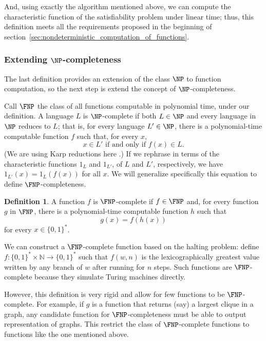 \documentclass[12pt]{article}
\theoremstyle{definition}
\newtheorem{definition}{Definition}
\begin{document}
And, using exactly the algorithm mentioned above,
we can compute the characteristic function of the satisfiability problem
under linear time;
thus, this definition meets all the requirements
proposed in the beginning of section~\ref{sec:nondeterministic_computation_of_functions}.

\subsubsection{Extending $\NP$-completeness}
\label{sec:np-completeness-extension}

The last definition provides an extension of the class $\NP$ to function computation,
so the next step is extend the concept of $\NP$-completeness.

Call $\FNP$ the class of all functions computable in polynomial time,
under our definition.
A language $L$ is $\NP$-complete if both $L \in \NP$
and every language in $\NP$ reduces to $L$;
that is, for every language $L' \in \NP$,
there is a polynomial-time computable function $f$
such that, for every $x$,
\begin{equation*}
    x \in L' \text{ if and only if } f(x) \in L.
\end{equation*}
(We are using Karp reductions here \cite[p.~42]{AroraBarak2009}.)
If we rephrase in terms of the characteristic functions $1_L$ and $1_{L'}$,
of $L$ and $L'$, respectively,
we have $1_{L'}(x) = 1_L(f(x))$ for all $x$.
We will generalize specifically this equation to define $\FNP$-completeness.

\begin{definition}
    A function $f$ is $\FNP$-complete if $f \in \FNP$ and,
    for every function $g$ in $\FNP$,
    there is a polynomial-time computable function $h$ such that
    \begin{equation*}
        g(x) = f(h(x))
    \end{equation*}
    for every $x \in \{0, 1\}^*$.
\end{definition}

We can construct a $\FNP$-complete function based on the halting problem:
define $f : \{0, 1\}^* \times \mathbb N \to \{0, 1\}^*$
such that $f(w, n)$ is the lexicographically greatest value written by any branch of $w$
after running for $n$ steps.
Such functions are $\FNP$-complete
because they simulate Turing machines directly.

However, this definition is very rigid
and allow for few functions to be $\FNP$-complete.
For example, if $g$ is a function that returns
(say) a largest clique in a graph,
any candidate function for $\FNP$-completeness
must be able to output representation of graphs.
This restrict the class of $\FNP$-complete functions
to functions like the one mentioned above.
\end{document}
